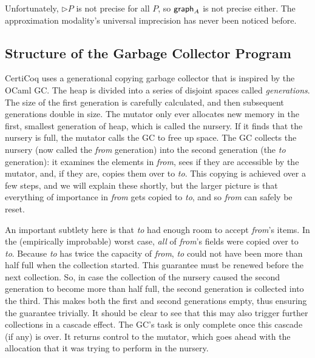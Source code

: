 Unfortunately, $\rhd P$ is not precise for all $P$, so $\mathsf{graph}_A$ is not precise either.  The approximation modality's universal imprecision has never been noticed before.

\subsection{Structure of the Garbage Collector Program}
\label{apx:gcstructure}


CertiCoq uses a generational copying garbage collector
that is inspired by the OCaml GC.
The heap is divided into a series of disjoint
spaces called \emph{generations}. The size of the first generation
is carefully calculated, and then subsequent generations
{\color{magenta}double in size}.
The mutator only ever allocates new memory in the first,
smallest generation of heap, which is called the nursery.
If it finds that the nursery is full,
the mutator calls the GC to free up space.
The GC collects the nursery
(now called the \emph{from} generation)
into the second generation (the \emph{to} generation):
it examines the elements
in \emph{from}, sees if they are accessible by
the mutator, and, if they are,
copies them over to \emph{to}. This copying is achieved over a few steps,
and we will explain these shortly, but the larger picture is that
everything of importance in \emph{from} gets copied to \emph{to},
and so \emph{from} can safely be reset.

An important subtlety here is that \emph{to} had enough
room to accept \emph{from}'s items.
In the (empirically improbable) worst case,
\emph{all} of \emph{from}'s fields were copied over to \emph{to}.
Because \emph{to} has twice the capacity of \emph{from},
\emph{to} could not have been more than half full when
the collection started.
This guarantee must be renewed before the next collection.
So, in case the collection of the nursery caused
the second generation to become more than half full,
the second generation is collected into the third. This makes
both the first and second generations empty, thus ensuring
the guarantee trivially. It should be
clear to see that this may also trigger further collections in
a cascade effect. The GC's task is only complete once this
cascade (if any) is over. It returns control to the mutator,
which goes ahead with
the allocation that it was trying to perform in the nursery.

